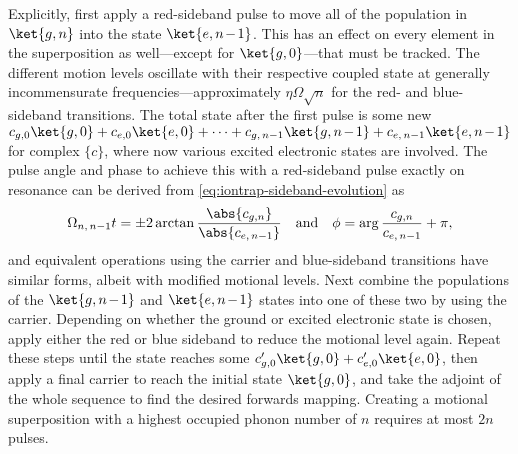 Explicitly, first apply a red-sideband pulse to move all of the population in $\ket{g,n}$ into the state $\ket{e,\msquash{n-1}}$.
This has an effect on every element in the superposition as well---except for $\ket{g,0}$---that must be tracked.
The different motion levels oscillate with their respective coupled state at generally incommensurate frequencies---approximately $\eta\Omega\sqrt n$ for the red- and blue-sideband transitions.
The total state after the first pulse is some new $c_{g,0}\ket{g,0} + c_{e,0}\ket{e,0} + \dotsb + c_{g,\,n-1}\ket{g,\msquash{n-1}} + c_{e,\,n-1}\ket{e,\msquash{n-1}}$ for complex $\{c\}$, where now various excited electronic states are involved.
The pulse angle and phase to achieve this with a red-sideband pulse exactly on resonance can be derived from \cref{eq:iontrap-sideband-evolution} as
\begin{equation}\label{eq:coherence-creation-angles}
\Omega_{n,\,n-1}t = \pm2\arctan\frac{\abs{c_{g,n}}}{\abs{c_{e,\,n-1}}} \quad\text{and}\quad
\phi = \arg\frac{c_{g,n}}{c_{e,\,n-1}} + \pi,
\end{equation}
and equivalent operations using the carrier and blue-sideband transitions have similar forms, albeit with modified motional levels.
Next combine the populations of the $\ket{g,\msquash{n-1}}$ and $\ket{e,\msquash{n-1}}$ states into one of these two by using the carrier.
Depending on whether the ground or excited electronic state is chosen, apply either the red or blue sideband to reduce the motional level again.
Repeat these steps until the state reaches some $c_{g,0}'\ket{g,0} + c_{e,0}'\ket{e,0}$, then apply a final carrier to reach the initial state $\ket{g,0}$, and take the adjoint of the whole sequence to find the desired forwards mapping.
Creating a motional superposition with a highest occupied phonon number of $n$ requires at most $2n$ pulses.

